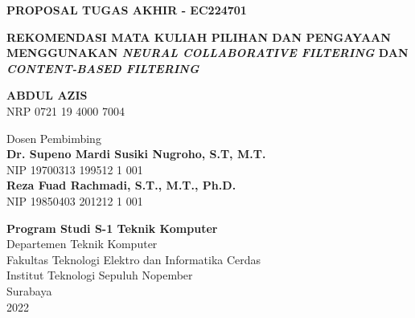{

\textbf{\large PROPOSAL TUGAS AKHIR - EC224701}

\vspace{2cm}

\begin{Large}
    \uppercase{\textbf{Rekomendasi mata kuliah pilihan dan pengayaan menggunakan \emph{Neural Collaborative Filtering} dan \emph{Content-Based Filtering}}}
\end{Large}

\vspace{2cm}

\begin{large}
    \uppercase{\textbf{Abdul Azis}} \\
    NRP 0721 19 4000 7004

    \vspace{1cm}

    Dosen Pembimbing \\
    \textbf{Dr. Supeno Mardi Susiki Nugroho, S.T, M.T.} \\
    NIP 19700313 199512 1 001 \\

    \textbf{Reza Fuad Rachmadi, S.T., M.T., Ph.D.} \\
    NIP 19850403 201212 1 001 \\
\end{large}

\vspace{1cm}

\textbf{Program Studi S-1 Teknik Komputer} \\
Departemen Teknik Komputer \\
Fakultas Teknologi Elektro dan Informatika Cerdas \\
Institut Teknologi Sepuluh Nopember \\

Surabaya \\
2022 \\
}
